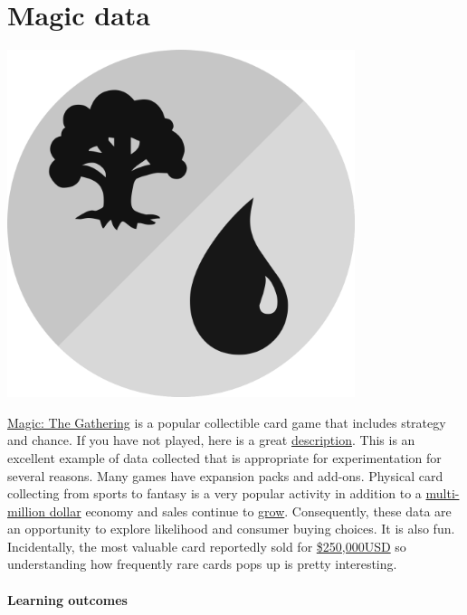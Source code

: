 \documentclass[
]{book}
\begin{document}
\hypertarget{magic}{%
\chapter{Magic data}\label{magic}}

\includegraphics[width=4in,height=\textheight]{./magic.png}

\href{https://magic.wizards.com/en}{Magic: The Gathering} is a popular collectible card game that includes strategy and chance. If you have not played, here is a great \href{https://en.wikipedia.org/wiki/Magic:_The_Gathering}{description}. This is an excellent example of data collected that is appropriate for experimentation for several reasons. Many games have expansion packs and add-ons. Physical card collecting from sports to fantasy is a very popular activity in addition to a \href{https://www.nytimes.com/2018/03/23/your-money/trading-cards-investment.html}{multi-million dollar} economy and sales continue to \href{https://www.forbes.com/sites/chriscason/2020/05/28/why-the-sports-card-industry-has-not-yet-reached-its-peak/\#763af2e31fb7}{grow}. Consequently, these data are an opportunity to explore likelihood and consumer buying choices. It is also fun. Incidentally, the most valuable card reportedly sold for \href{https://screenrant.com/magic-the-gathering-most-rare-expensive-valuable-cards/}{\$250,000USD} so understanding how frequently rare cards pops up is pretty interesting.

\hypertarget{learning-outcomes}{%
\subsubsection*{Learning outcomes}\label{learning-outcomes}}
\end{document}

